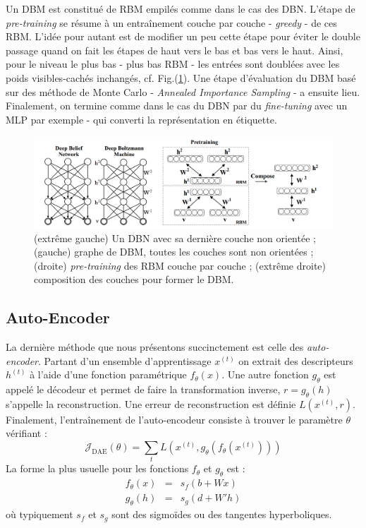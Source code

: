 \documentclass[10pt,a4paper]{article}
\begin{document}
Un DBM est constitué de RBM empilés comme dans le cas des DBN. L'étape de \emph{pre-training} se résume à un entraînement couche par couche - \emph{greedy} - de ces RBM. L'idée pour autant est de modifier un peu cette étape pour éviter le double passage quand on fait les étapes de haut vers le bas et bas vers le haut. Ainsi, pour le niveau le plus bas - plus bas RBM - les entrées sont doublées avec les poids visibles-cachés inchangés, cf. Fig.(\ref{fig5}). Une étape d'évaluation du DBM basé sur des méthode de Monte Carlo - \emph{Annealed Importance Sampling} - a ensuite lieu. Finalement, on termine comme dans le cas du DBN par du \emph{fine-tuning} avec un MLP par exemple - qui converti la représentation en étiquette.

\begin{figure}[ht!]
\centering
\includegraphics[width = \columnwidth]{fig/dbm.png}
\caption{(extrême gauche) Un DBN avec sa dernière couche non orientée ; (gauche) graphe de DBM, toutes les couches sont non orientées ; (droite) \emph{pre-training} des RBM couche par couche ; (extrême droite) composition des couches pour former le DBM.}
\label{fig5}
\end{figure}




\subsection{Auto-Encoder}

La dernière méthode que nous présentons succinctement est celle des \emph{auto-encoder}. Partant d'un ensemble d'apprentissage $x^{(t)}$ on extrait des descripteurs $h^{(t)}$ à l'aide d'une fonction paramétrique $f_{\theta}(x)$. Une autre fonction $g_{\theta}$ est appelé le décodeur et permet de faire la transformation inverse, $r=g_{\theta}(h)$ s'appelle la reconstruction. Une erreur de reconstruction est définie $L(x^{(t)}, r)$. Finalement, l'entraînement de l'auto-encodeur consiste à trouver le paramètre $\theta$ vérifiant :
\begin{equation}
\mathcal{J}_{\text{DAE}}(\theta) = \sum_{t} L(x^{(t)}, g_{\theta}(f_{\theta}(x^{(t)})))
\end{equation}
La forme la plus usuelle pour les fonctions $f_{\theta}$ et $g_{\theta}$ est : 
\begin{equation}
\begin{array}{rll}
f_{\theta}(x) & = & s_f(b + Wx) \\
g_{\theta}(h) & = & s_g(d + W'h)
\end{array}
\end{equation}
où typiquement $s_f$ et $s_g$ sont des sigmoïdes ou des tangentes hyperboliques. 
\end{document}

